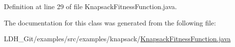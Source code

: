 Definition at line 29 of file Knapsack\-Fitness\-Function.\-java.



The documentation for this class was generated from the following file\-:\begin{DoxyCompactItemize}
\item 
L\-D\-H\-\_\-\-Git/examples/src/examples/knapsack/\hyperlink{knapsack_2_knapsack_fitness_function_8java}{Knapsack\-Fitness\-Function.\-java}\end{DoxyCompactItemize}
